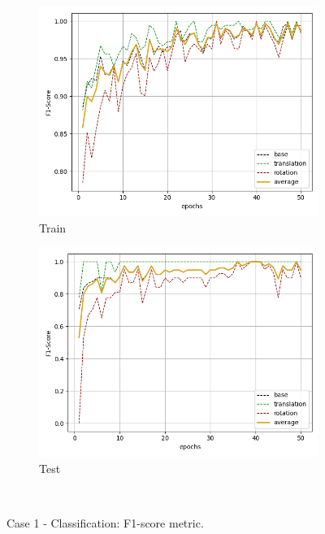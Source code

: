 \begin{figure}[H]
    \begin{subfigure}{.48\linewidth}
    \centering
    \includegraphics[scale=0.45]{Img/cls_nonoise_train_f1.png}
    \caption{Train}
    \end{subfigure}
    \begin{subfigure}{.48\linewidth}
    \centering
    \includegraphics[scale=0.45]{Img/cls_nonoise_test_f1.png}
    \caption{Test}
    \end{subfigure}\\
    \caption{Case 1 - Classification: F1-score metric. }
\end{figure}
